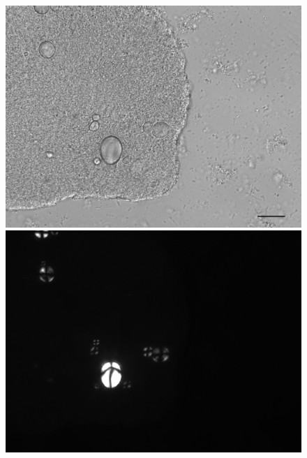 \documentclass[
  b5paper,
]{book}
\begin{document}
\begin{figure}

\begin{minipage}{0.50\linewidth}
\includegraphics{figures/starches_w_bar.jpg}\end{minipage}%
%
\begin{minipage}{0.50\linewidth}
\includegraphics{figures/st2C3.2-mix.jpg}\end{minipage}%
\newline
\begin{minipage}{0.50\linewidth}

\end{minipage}
\end{figure}
\end{document}
